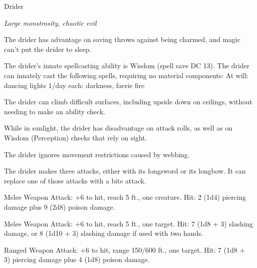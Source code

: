 \begin{monsterbox}{Drider}
\begin{hangingpar}
\textit{Large monstrosity, chaotic evil}
\end{hangingpar}
\dndline%
\basics[%
armorclass = 19,
hitpoints = 13d10 + 52,
speed = {30 ft., climb 30 ft.}
]
\dndline%
\stats[%
STR = \stat{16},
DEX = \stat{16},
CON = \stat{18},
INT = \stat{13},
WIS = \stat{14},
CHA = \stat{12}
]
\dndline%
\details[%
skills={Stealth +9, Perception +5, },
damageimmunities={},
savingthrows={},
conditionimmunities={},
damageresistances={},
damagevulnerabilities={},
senses={darkvision 120 ft., passive Perception 15},
languages={Elvish, Undercommon},
challenge=6
]
\dndline%
\begin{monsteraction}
The drider has advantage on saving throws against being charmed, and magic can't put the drider to sleep.
\end{monsteraction}
\begin{monsteraction}
The drider's innate spellcasting ability is Wisdom (spell save DC 13). The drider can innately cast the following spells, requiring no material components:
At will: dancing lights
1/day each: darkness, faerie fire
\end{monsteraction}
\begin{monsteraction}
The drider can climb difficult surfaces, including upside down on ceilings, without needing to make an ability check.
\end{monsteraction}
\begin{monsteraction}
While in sunlight, the drider has disadvantage on attack rolls, as well as on Wisdom (Perception) checks that rely on sight.
\end{monsteraction}
\begin{monsteraction}
The drider ignores movement restrictions caused by webbing.
\end{monsteraction}
\begin{monsteraction}[Multiattack]
The drider makes three attacks, either with its longsword or its longbow. It can replace one of those attacks with a bite attack.
\end{monsteraction}
\begin{monsteraction}[Bite]
Melee Weapon Attack: +6 to hit, reach 5 ft., one creature. Hit: 2 (1d4) piercing damage plus 9 (2d8) poison damage.
\end{monsteraction}
\begin{monsteraction}[Longsword]
Melee Weapon Attack: +6 to hit, reach 5 ft., one target. Hit: 7 (1d8 + 3) slashing damage, or 8 (1d10 + 3) slashing damage if used with two hands.
\end{monsteraction}
\begin{monsteraction}[Longbow]
Ranged Weapon Attack: +6 to hit, range 150/600 ft., one target. Hit: 7 (1d8 + 3) piercing damage plus 4 (1d8) poison damage.
\end{monsteraction}
\end{monsterbox}